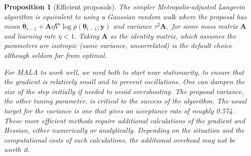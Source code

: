 \documentclass[
  11pt,
  letterpaper,
]{scrbook}
\theoremstyle{definition}
\theoremstyle{definition}
\theoremstyle{definition}
\theoremstyle{plain}
\newtheorem{proposition}{Proposition}[chapter]
\theoremstyle{plain}
\theoremstyle{plain}
\theoremstyle{remark}
\begin{document}
\begin{proposition}[Efficient
proposals]
The simpler Metropolis-adjusted Langevin algorithm is equivalent to
using a Gaussian random walk where the proposal has mean
\(\boldsymbol{\theta}_{t-1} + \mathbf{A}\eta \nabla \log p(\boldsymbol{\theta}_{t-1}; \boldsymbol{y})\)
and variance \(\tau^2\mathbf{A},\) for some mass matrix \(\mathbf{A}\)
and learning rate \(\eta < 1.\) Taking \(\mathbf{A}\) as the identity
matrix, which assumes the parameters are isotropic (same variance,
uncorrelated) is the default choice although seldom far from optimal.

For MALA to work well, we need both to start near stationarity, to
ensure that the gradient is relatively small and to prevent
oscillations. One can dampen the size of the step initially if needed to
avoid overshooting. The proposal variance, the other tuning parameter,
is critical to the success of the algorithm. The usual target for the
variance is one that gives an acceptance rate of roughly 0.574. These
more efficient methods require additional calculations of the gradient
and Hessian, either numerically or analytically. Depending on the
situation and the computational costs of such calculations, the
additional overhead may not be worth it.

\end{proposition}
\end{document}
